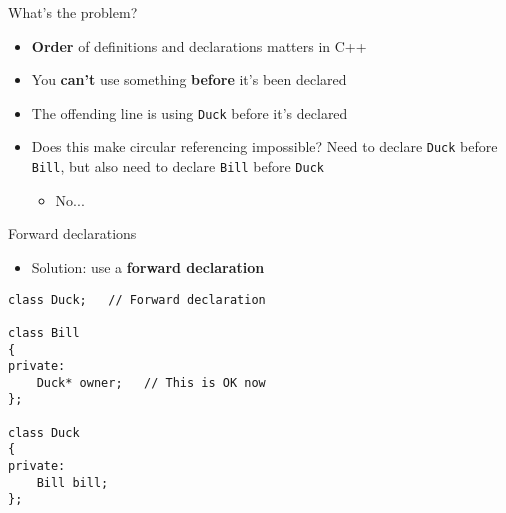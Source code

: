 \begin{frame}[fragile]{What's the problem?}
    \begin{itemize}
        \item \textbf{Order} of definitions and declarations matters in C++ \pause
        \item You \textbf{can't} use something \textbf{before} it's been declared \pause
        \item The offending line is using \lstinline{Duck} before it's declared \pause
        \item Does this make circular referencing impossible?
            Need to declare \lstinline{Duck} before \lstinline{Bill},
            but also need to declare \lstinline{Bill} before \lstinline{Duck} \pause
            \begin{itemize}
                \item No...
            \end{itemize}
    \end{itemize}
\end{frame}

\begin{frame}[fragile]{Forward declarations}
    \begin{itemize}
        \item Solution: use a \textbf{forward declaration} \pause
    \end{itemize}
    \begin{lstlisting}
class Duck;   // Forward declaration

class Bill
{
private:
    Duck* owner;   // This is OK now
};

class Duck
{
private:
    Bill bill;
};
    \end{lstlisting}
\end{frame}

